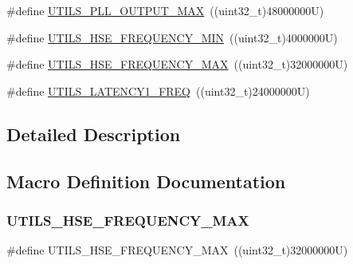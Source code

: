 \begin{DoxyCompactItemize}
\item 
\#define \hyperlink{group___u_t_i_l_s___l_l___private___constants_ga3edafc754826e07341fecc87bf2c9a39}{U\+T\+I\+L\+S\+\_\+\+P\+L\+L\+\_\+\+O\+U\+T\+P\+U\+T\+\_\+\+M\+AX}~((uint32\+\_\+t)48000000\+U)
\item 
\#define \hyperlink{group___u_t_i_l_s___l_l___private___constants_ga7bc514193367ab0d598fe4c3bedd6066}{U\+T\+I\+L\+S\+\_\+\+H\+S\+E\+\_\+\+F\+R\+E\+Q\+U\+E\+N\+C\+Y\+\_\+\+M\+IN}~((uint32\+\_\+t)4000000\+U)
\item 
\#define \hyperlink{group___u_t_i_l_s___l_l___private___constants_gae3407ef407af85f72bbba3db982a1826}{U\+T\+I\+L\+S\+\_\+\+H\+S\+E\+\_\+\+F\+R\+E\+Q\+U\+E\+N\+C\+Y\+\_\+\+M\+AX}~((uint32\+\_\+t)32000000\+U)
\item 
\#define \hyperlink{group___u_t_i_l_s___l_l___private___constants_gaad8153359f1c7dc9ecb053eefdbd58d8}{U\+T\+I\+L\+S\+\_\+\+L\+A\+T\+E\+N\+C\+Y1\+\_\+\+F\+R\+EQ}~((uint32\+\_\+t)24000000\+U)
\end{DoxyCompactItemize}


\subsection{Detailed Description}


\subsection{Macro Definition Documentation}
\mbox{\label{group___u_t_i_l_s___l_l___private___constants_gae3407ef407af85f72bbba3db982a1826}} 
\subsubsection{\texorpdfstring{U\+T\+I\+L\+S\+\_\+\+H\+S\+E\+\_\+\+F\+R\+E\+Q\+U\+E\+N\+C\+Y\+\_\+\+M\+AX}{UTILS\_HSE\_FREQUENCY\_MAX}}
{\footnotesize\ttfamily \#define U\+T\+I\+L\+S\+\_\+\+H\+S\+E\+\_\+\+F\+R\+E\+Q\+U\+E\+N\+C\+Y\+\_\+\+M\+AX~((uint32\+\_\+t)32000000\+U)}

